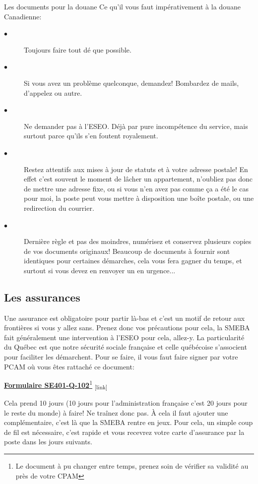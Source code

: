 \begin{example}{Les documents pour la douane}
 Ce qu'il vous faut impérativement à la douane Canadienne:
 \begin{description}
   \item[$\bullet$]Toujours faire tout dé que possible.
   \item[$\bullet$]Si vous avez un problème quelconque, demandez! Bombardez de mails, d’appelez ou autre.
   \item[$\bullet$]Ne demander pas à l’ESEO. Déjà par pure incompétence du service, mais surtout parce qu’ils s’en foutent royalement.
   \item[$\bullet$]Restez attentifs aux mises à jour de statuts et à votre adresse postale!
   En effet c’est souvent le moment de lâcher un appartement, n’oubliez pas donc de mettre une adresse fixe, ou si vous n’en avez pas comme ça a été le cas pour moi, la poste peut vous mettre à disposition une boîte postale, ou une redirection du courrier.
   \item[$\bullet$]Dernière règle et pas des moindres, numérisez et conservez plusieurs copies de vos documents originaux! Beaucoup de documents à fournir sont identiques pour certaines démarches, cela vous fera gagner du temps, et surtout si vous devez en renvoyer un en urgence...
 \end{description}
\end{example}


 \subsection{Les assurances}\label{sec:sec3.2.7}
 Une assurance est obligatoire pour partir là-bas et c'est un motif de retour aux frontières si vous y allez sans. Prenez donc vos précautions pour cela, la SMEBA fait généralement une intervention à l'ESEO pour cela, allez-y. La particularité du Québec est que notre sécurité sociale française et celle québécoise s'associent pour faciliter les démarchent. Pour se faire, il vous faut faire signer par votre PCAM où vous êtes rattaché ce document:

 \bigbreak
 \href{Annexes/Sherbrooke/SE401-Q-102.pdf}{\textbf{Formulaire SE401-Q-102}\footnote{Le document à pu changer entre temps, prenez soin de vérifier sa validité au près de votre CPAM}}\textsubscript{  [link]}
 \bigbreak


 Cela prend 10 jours (10 jours pour l'administration française c'est 20 jours pour le reste du monde) à faire! Ne traînez donc pas.
 À cela il faut ajouter une complémentaire, c'est là que la SMEBA rentre en jeux. Pour cela, un simple coup de fil est nécessaire, c'est rapide et vous recevrez votre carte d'assurance par la poste dans les jours suivants.


